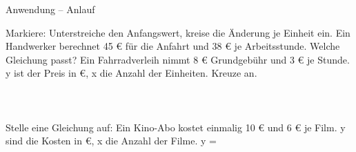 \setcounter{aufgabe}{0}

\begin{aufgabe}{Anwendung – Anlauf}
\begin{teile}
\teil Markiere: Unterstreiche den Anfangswert, kreise die Änderung je Einheit ein. Ein Handwerker berechnet 45 € für die Anfahrt und 38 € je Arbeitsstunde.
\teil Welche Gleichung passt? Ein Fahrradverleih nimmt 8 € Grundgebühr und 3 € je Stunde. y ist der Preis in €, x die Anzahl der Einheiten. Kreuze an. \\  \\  \\  \\ 
\teil Stelle eine Gleichung auf: Ein Kino-Abo kostet einmalig 10 € und 6 € je Film. y sind die Kosten in €, x die Anzahl der Filme. y = \leerfeld
\end{teile}
\end{aufgabe}

